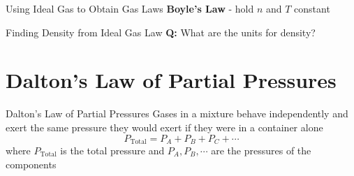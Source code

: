 \documentclass[11pt]{beamer}
\begin{document}
\begin{frame}{Using Ideal Gas to Obtain Gas Laws}
  \textbf{Boyle's Law} - hold $n$ and $T$ constant
\end{frame}

\begin{frame}{Finding Density from Ideal Gas Law}
  \textbf{Q:} What are the units for density?
\end{frame}

\section{Dalton's Law of Partial Pressures}

\begin{frame}{Dalton's Law of Partial Pressures}
  Gases in a mixture behave independently and exert the same pressure they would
  exert if they were in a container alone
  \begin{equation}
    P_\text{Total} = P_A + P_B + P_C + \cdots
  \end{equation}
  where $P_\text{Total}$ is the total pressure and $P_A, P_B, \cdots$ are the
  pressures of the components
\end{frame}
\end{document}
